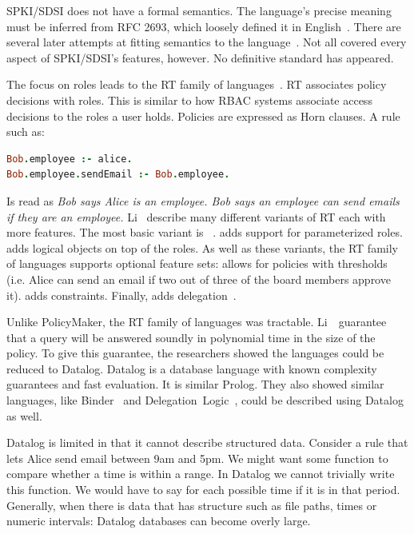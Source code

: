\documentclass[thesis.tex]{subfiles}
\begin{document}
SPKI/SDSI does not have a formal semantics.  The language's precise meaning must be inferred from
RFC 2693, which loosely defined it in English~\cite{ellison_spki_1999}. There are
several later attempts at fitting semantics to the
language~\cite{joseph_y._halpern_logic_1999,abadi_sdsis_1998,howell_formal_2000,dwaine_clarke_certificate_2001}.
Not all covered every aspect of SPKI/SDSI's features, however. No definitive standard has appeared.

The focus on roles leads to the RT family of
languages~\cite{ninghui_li_design_2002}. RT associates policy
decisions with roles. This is similar to how \ac{RBAC} systems associate access
decisions to the roles a user holds.  Policies are expressed as Horn
clauses.  A rule such as:

\begin{lstlisting}[language=prolog]
Bob.employee :- alice.
Bob.employee.sendEmail :- Bob.employee.
\end{lstlisting}

Is read as \emph{Bob says Alice is an employee.  Bob says an
employee can send emails if they are an employee.}  Li~\etal{}
describe many different variants of RT each with more features.  The most basic variant is
~\cite{li_distributed_2003}.  adds support for
parameterized roles.  adds logical objects on top of the
roles.  As well as these variants, the RT family of languages
supports optional feature sets:  allows for policies with
thresholds (i.e. Alice can send an email if two out of three of the
board members approve it).  adds constraints. Finally, 
adds delegation~\cite{ninghui_li_design_2002}.

Unlike PolicyMaker, the RT family of languages was tractable. Li~\etal~guarantee
that a query will be answered soundly in polynomial time in the size of the
policy. To give this guarantee, the researchers showed the languages could be
reduced to Datalog. Datalog is a database language with known complexity
guarantees and fast evaluation. It is similar Prolog. They also showed similar
languages, like Binder~\cite{detreville_binder_2002} and
Delegation~Logic~\cite{li_delegation_2003,li_practically_2000}, could be
described using Datalog as well.

Datalog is limited in that it cannot describe structured data. Consider a rule
that lets Alice send email between 9am and 5pm. We might want some function to
compare whether a time is within a range. In Datalog we cannot trivially write
this function. We would have to say for each possible time if it is in that
period. Generally, when there is data that has structure such as file paths,
times or numeric intervals: Datalog databases can become overly large.
\end{document}

